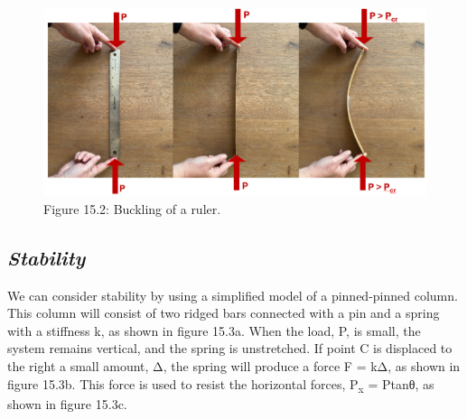 \documentclass[
  letterpaper,
  DIV=11,
  numbers=noendperiod]{scrreprt}
\begin{document}
\begin{figure}[H]

{\centering \includegraphics{images/CH15s PNGs/figure 15.2.png}

}

\caption{Figure 15.2: Buckling of a ruler.}

\end{figure}%

\subsection{\texorpdfstring{\emph{Stability}}{Stability}}\label{stability}

We can consider stability by using a simplified model of a pinned-pinned
column. This column will consist of two ridged bars connected with a pin
and a spring with a stiffness k, as shown in figure 15.3a. When the
load, P, is small, the system remains vertical, and the spring is
unstretched. If point C is displaced to the right a small amount, Δ, the
spring will produce a force F = kΔ, as shown in figure 15.3b. This force
is used to resist the horizontal forces, P\textsubscript{x} = Ptanθ, as
shown in figure 15.3c.
\end{document}

